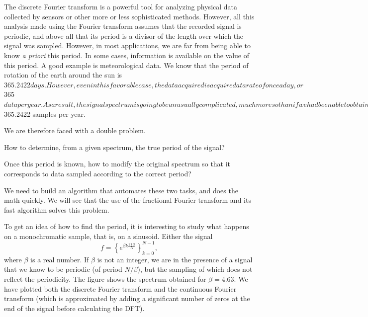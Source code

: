  
   The discrete Fourier transform is a powerful tool for analyzing physical data collected by sensors or other more or less sophisticated methods. However, all this analysis made using the Fourier transform assumes that the recorded signal is periodic, and above all that its period is a divisor of the length over which the signal was sampled. However, in most applications, we are far from being able to know \textit{a priori} this period. In some cases, information is available on the value of this period. A good example is meteorological data. We know that the period of rotation of the earth around the sun is $ 365.2422 days. However, even in this favorable case, the data acquired is acquired at a rate of once a day, or $ 365 $ data per year. As a result, the signal spectrum is going to be unusually complicated, much more so than if we had been able to obtain exactly $ 365.2422 samples per year.
 
 
We are therefore faced with a double problem. \begin{rs}
\item How to determine, from a given spectrum, the true period of the signal?
\item Once this period is known, how to modify the original spectrum so that it corresponds to data sampled according to the correct period?
\end{rs} We need to build an algorithm that automates these two tasks, and does the math quickly. We will see that the use of the fractional Fourier transform and its fast algorithm solves this problem.
 
 
To get an idea of how to find the period, it is interesting to study what happens on a monochromatic sample, that is, on a sinusoid. Either the signal
\begin{equation*}
f = \left\{e^{\beta k \frac{2 \imath \pi}{N}} \right\}_{k = 0}^{N-1},
\end{equation*}
where $ \beta $ is a real number. If $ \beta $ is not an integer, we are in the presence of a signal that we know to be periodic (of period $ N / \beta $), but the sampling of which does not reflect the periodicity. The figure  shows the spectrum obtained for $ \beta = 4.63 $. We have plotted both the discrete Fourier transform and the continuous Fourier transform (which is approximated by adding a significant number of zeros at the end of the signal before calculating the DFT). 

